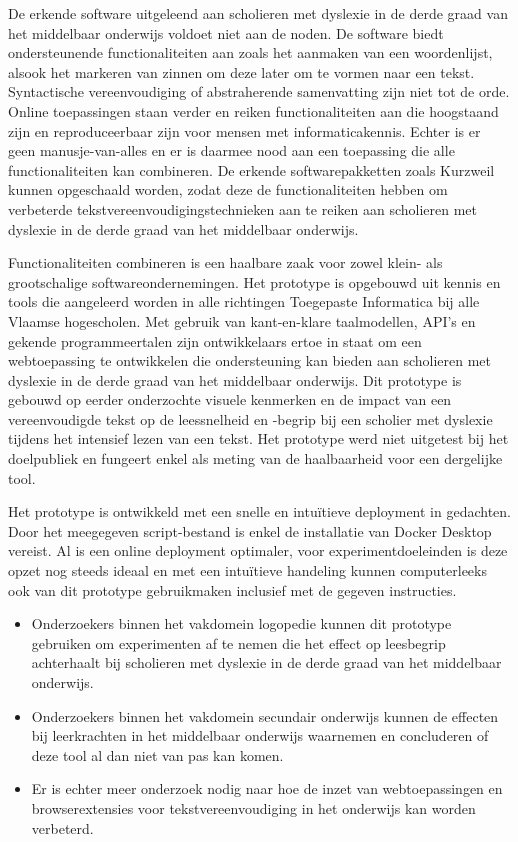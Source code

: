 De erkende software uitgeleend aan scholieren met dyslexie in de derde graad van het middelbaar onderwijs voldoet niet aan de noden. De software biedt ondersteunende functionaliteiten aan zoals het aanmaken van een woordenlijst, alsook het markeren van zinnen om deze later om te vormen naar een tekst. Syntactische vereenvoudiging of abstraherende samenvatting zijn niet tot de orde. Online toepassingen staan verder en reiken functionaliteiten aan die hoogstaand zijn en reproduceerbaar zijn voor mensen met informaticakennis. Echter is er geen manusje-van-alles en er is daarmee nood aan een toepassing die alle functionaliteiten kan combineren. De erkende softwarepakketten zoals Kurzweil kunnen opgeschaald worden, zodat deze de functionaliteiten hebben om verbeterde tekstvereenvoudigingstechnieken aan te reiken aan scholieren met dyslexie in de derde graad van het middelbaar onderwijs. 

\medspace

Functionaliteiten combineren is een haalbare zaak voor zowel klein- als grootschalige softwareondernemingen. Het prototype is opgebouwd uit kennis en tools die aangeleerd worden in alle richtingen Toegepaste Informatica bij alle Vlaamse hogescholen. Met gebruik van kant-en-klare taalmodellen, API's en gekende programmeertalen zijn ontwikkelaars ertoe in staat om een webtoepassing te ontwikkelen die ondersteuning kan bieden aan scholieren met dyslexie in de derde graad van het middelbaar onderwijs. Dit prototype is gebouwd op eerder onderzochte visuele kenmerken en de impact van een vereenvoudigde tekst op de leessnelheid en -begrip bij een scholier met dyslexie tijdens het intensief lezen van een tekst. Het prototype werd niet uitgetest bij het doelpubliek en fungeert enkel als meting van de haalbaarheid voor een dergelijke tool. 

\medspace

Het prototype is ontwikkeld met een snelle en intuïtieve deployment in gedachten. Door het meegegeven script-bestand is enkel de installatie van Docker Desktop vereist. Al is een online deployment optimaler, voor experimentdoeleinden is deze opzet nog steeds ideaal en met een intuïtieve handeling kunnen computerleeks ook van dit prototype gebruikmaken inclusief met de gegeven instructies. 

\begin{itemize}
	\item Onderzoekers binnen het vakdomein logopedie kunnen dit prototype gebruiken om experimenten af te nemen die het effect op leesbegrip achterhaalt bij scholieren met dyslexie in de derde graad van het middelbaar onderwijs. 
	\item Onderzoekers binnen het vakdomein secundair onderwijs kunnen de effecten bij leerkrachten in het middelbaar onderwijs waarnemen en concluderen of deze tool al dan niet van pas kan komen. 
	\item Er is echter meer onderzoek nodig naar hoe de inzet van webtoepassingen en browserextensies voor tekstvereenvoudiging in het onderwijs kan worden verbeterd. 
\end{itemize}

